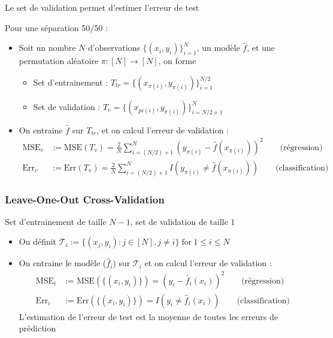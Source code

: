\documentclass[12pt,a4paper]{article}
\begin{document}
Le set de validation permet d'estimer l'erreur de test

Pour une séparation 50/50 :

\begin{itemize}
    \item Soit un nombre $N$ d'observations $\{(x_i, y_i)\}_{i=1}^N$, un modèle $\hat{f}$, et une permutation aléatoire $\pi : [N] \rightarrow [N]$, on forme
    \begin{itemize}
        \item Set d'entrainement : $T_{tr} = \{(x_{\pi(i)}, y_{\pi(i)})\}_{i=1}^{N/2}$
        \item Set de validation : $T_{v} = \{(x_{pi(i)}, y_{\pi(i)})\}_{i=N/2 + 1}^N$
    \end{itemize}
    \item On entraine $\hat{f}$ sur $T_{tr}$, et on calcul l'erreur de validation :
    \begin{align*}
        \text{MSE}_v &:= \text{MSE}(T_v) = \frac{2}{N} \sum_{i=(N/2)+1}^N (y_{\pi(i)} - \hat{f} (x_{\pi(i)}))^2 \qquad \text{(régression)}\\
        \text{Err}_v &:= \text{Err}(T_v) = \frac{2}{N} \sum_{i=(N/2)+1}^N I(y_{\pi(i)} \neq \hat{f}(x_{\pi(i)})) \qquad \text{(classification)} 
    \end{align*}
\end{itemize}

\subsubsection{Leave-One-Out Cross-Validation}

Set d'entrainement de taille $N-1$, set de validation de taille $1$

\begin{itemize}
    \item On définit $\mathcal{T}_i := \{(x_j,y_i): j \in [N], j\neq i\} \; \text{for} \: 1 \leq i \leq N$
    \item On entraine le modèle ($\hat{f}_i$) sur $\mathcal{T}_i$ et on calcul l'erreur de validation :
    \begin{align*}
        \text{MSE}_i &:= \text{MSE}(\{(x_i, y_i)\}) = (y_i - \hat{f}_i(x_i))^2 \qquad \text{(régression)}\\
        \text{Err}_i &:= \text{Err}(\{(x_i, y_i)\}) = I(y_i \neq \hat{f}_i(x_i)) \qquad \text{(classification)}
    \end{align*}
    L'estimation de l'erreur de test est la moyenne de toutes les erreurs de prédiction
\end{itemize}
\end{document}
